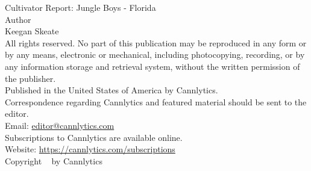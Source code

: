 \documentclass[../article.tex, 11pt]{subfiles}
\begin{document}
{\parindent0pt
{\Large Cultivator Report: Jungle Boys - Florida}\\[2\baselineskip]
{\Large Author \\[.5\baselineskip]}
\large Keegan Skeate \\[2.\baselineskip]

All rights reserved. No part of this publication may be reproduced in any form or by any means, electronic or mechanical, including photocopying, recording, or by any information storage and retrieval system, without the written permission of the publisher.\\[.25\baselineskip]

Published in the United States of America by Cannlytics.\\[.25\baselineskip]

Correspondence regarding Cannlytics and featured material should be sent to the editor.\\[.2\baselineskip] Email: \href{mailto:editor@cannlytics.com}{editor@cannlytics.com} \\[.25\baselineskip]

Subscriptions to Cannlytics are available online.\\[.2\baselineskip] Website: \href{https://cannlytics.com/subscriptions}{https://cannlytics.com/subscriptions}\\[.25\baselineskip]

\vspace*{2\baselineskip}
\vfill
{\normalsize Copyright \textcopyright ~\the\year{} by Cannlytics\\[\baselineskip]}

}
\end{document}
